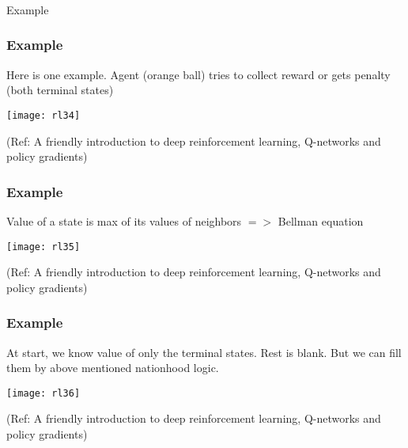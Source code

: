 \begin{frame}[fragile]\frametitle{}
\begin{center}
{\Large Example}
\end{center}
\end{frame}



\begin{frame}[fragile]\frametitle{Example}

Here is one example. Agent (orange ball) tries to collect reward or gets penalty (both terminal states)

\begin{center}
\texttt{[image: rl34]}
\end{center}

{\tiny (Ref: A friendly introduction to deep reinforcement learning, Q-networks and policy gradients)}

\end{frame}

\begin{frame}[fragile]\frametitle{Example}

Value of a state is max of its values of neighbors $=>$ Bellman equation

\begin{center}
\texttt{[image: rl35]}
\end{center}

{\tiny (Ref: A friendly introduction to deep reinforcement learning, Q-networks and policy gradients)}

\end{frame}

\begin{frame}[fragile]\frametitle{Example}

At start, we know value of only the terminal states. Rest is blank. But we can fill them by above mentioned nationhood logic.

\begin{center}
\texttt{[image: rl36]}
\end{center}

{\tiny (Ref: A friendly introduction to deep reinforcement learning, Q-networks and policy gradients)}

\end{frame}

